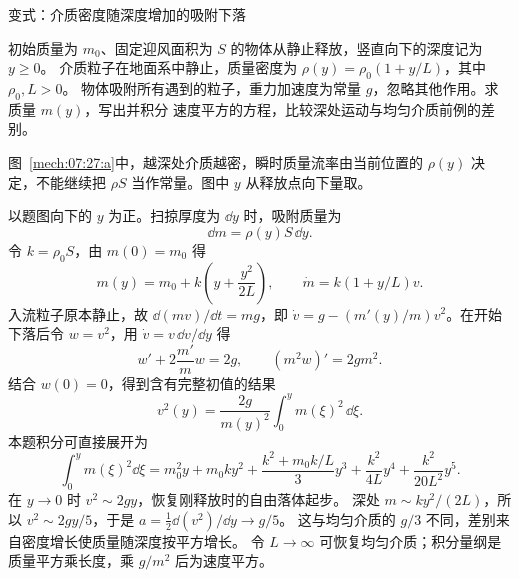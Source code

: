 {\begin{origexamplebox}{变式：介质密度随深度增加的吸附下落}\label{ch07:ex:s09-3-27}

初始质量为 $m_0$、固定迎风面积为 $S$ 的物体从静止释放，竖直向下的深度记为 $y\ge0$。
介质粒子在地面系中静止，质量密度为 $\rho(y)=\rho_0(1+y/L)$，其中 $\rho_0,L>0$。
物体吸附所有遇到的粒子，重力加速度为常量 $g$，忽略其他作用。求质量 $m(y)$，写出并积分
速度平方的方程，比较深处运动与均匀介质前例的差别。

\begin{qualityfigure}
\label{mech:07:27:q}
\end{qualityfigure}
\end{origexamplebox}

\begin{xesolution}
\begin{qualityfigure}
\label{mech:07:27:a}
\end{qualityfigure}
图~\ref{mech:07:27:a}中，越深处介质越密，瞬时质量流率由当前位置的 $\rho(y)$ 决定，不能继续把 $\rho S$ 当作常量。图中 $y$ 从释放点向下量取。

以题图向下的 $y$ 为正。扫掠厚度为 $\dd y$ 时，吸附质量为
\[
 \dd m=\rho(y)S\,\dd y.
\]
令 $k=\rho_0S$，由 $m(0)=m_0$ 得
\[
 \boxed{m(y)=m_0+k\left(y+\frac{y^2}{2L}\right)},\qquad
 \dot m=k(1+y/L)v.
\]
入流粒子原本静止，故 $\dd(mv)/\dd t=mg$，即
$\dot v=g-(m'(y)/m)v^2$。在开始下落后令 $w=v^2$，用 $\dot v=v\,\dd v/\dd y$ 得
\[
 w'+2\frac{m'}m w=2g,\qquad (m^2w)'=2gm^2.
\]
结合 $w(0)=0$，得到含有完整初值的结果
\[
 \boxed{v^2(y)=\frac{2g}{m(y)^2}\int_0^y m(\xi)^2\,\dd\xi}.
\]
本题积分可直接展开为
\[
 \int_0^y m(\xi)^2\dd\xi
 =m_0^2y+m_0ky^2+\frac{k^2+m_0k/L}{3}y^3
 +\frac{k^2}{4L}y^4+\frac{k^2}{20L^2}y^5.
\]
在 $y\to0$ 时 $v^2\sim2gy$，恢复刚释放时的自由落体起步。
深处 $m\sim ky^2/(2L)$，所以 $v^2\sim2gy/5$，于是 $a=\tfrac12\dd(v^2)/\dd y\to g/5$。
这与均匀介质的 $g/3$ 不同，差别来自密度增长使质量随深度按平方增长。
令 $L\to\infty$ 可恢复均匀介质；积分量纲是质量平方乘长度，乘 $g/m^2$ 后为速度平方。
\end{xesolution}

}
